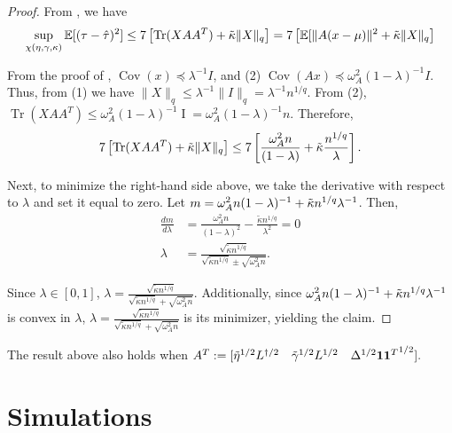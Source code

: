 \documentclass[12pt]{article}
\theoremstyle{definition}
\numberwithin{equation}{section}
\numberwithin{figure}{section}
\numberwithin{equation}{section}
\numberwithin{figure}{section}
\begin{document}
\begin{proof} \label{pf_thm_gsw}
From , we have 
\begin{align*}
    \sup_{\chi(\eta, \gamma, \kappa)} \mathbb{E}[(\tau - \hat{\tau})^2] \leq 7 \left[ \operatorname{Tr}(X AA^T) + \Tilde{\kappa} \| X\|_q \right]= 7 \left[\mathbb{E}[\|A(x-\mu)\|^2 + \Tilde{\kappa} \| X\|_q \right]
\end{align*}

From the proof of \citet[Theorem 6.4]{harshaw2024balancing}, $\operatorname{Cov}(x) \preceq \lambda^{-1}I$, and (2) $\operatorname{Cov}(Ax) \preceq \omega_A^2 (1-\lambda)^{-1}I$. Thus, from (1) we have $\| X \|_q \leq \lambda^{-1}\|I \|_q = \lambda^{-1} n^{1/q}$. From (2), $\operatorname{Tr}(XAA^T) \leq \omega_A^2 (1-\lambda)^{-1} \operatorname{I} = \omega_A^2 (1-\lambda)^{-1} n$. Therefore, 
\begin{align*}
    7 \left[ \operatorname{Tr}(X AA^T) + \Tilde{\kappa} \| X\|_q \right] \leq 7 \left[  \frac{\omega_A^2 n}{(1-\lambda)}+ \Tilde{\kappa} \frac{n^{1/q}}{\lambda} \right].
\end{align*}

Next, to minimize the right-hand side above, we take the derivative with respect to $\lambda$ and set it equal to zero. Let $m = \omega_A^2 n (1-\lambda)^{-1}+ \Tilde{\kappa} n^{1/q}\lambda^{-1}$. Then, 
\begin{align*}
    \frac{dm}{d\lambda} &= \frac{\omega_A^2 n}{(1-\lambda)^2} - \frac{\tilde{\kappa} n^{1/q}}{\lambda^2} = 0 \\
    \lambda &= \frac{\sqrt{\tilde{\kappa}n^{1/q}}}{\sqrt{\tilde{\kappa}n^{1/q}} \pm \sqrt{\omega_A^2 n}}.
\end{align*}

Since $\lambda \in [0,1]$, $\lambda = \frac{\sqrt{\tilde{\kappa}n^{1/q}}}{\sqrt{\tilde{\kappa}n^{1/q}} + \sqrt{\omega_A^2 n}}.$ Additionally, since $\omega_A^2 n(1-\lambda)^{-1}+ \Tilde{\kappa} n^{1/q}\lambda^{-1}$ is convex in $\lambda$, $\lambda = \frac{\sqrt{\tilde{\kappa}n^{1/q}}}{\sqrt{\tilde{\kappa}n^{1/q}} + \sqrt{\omega_A^2 n}}$ is its minimizer, yielding the claim.
\end{proof}

The result above also holds when $A^T:= [\Tilde{\eta}^{1/2}L^{\dagger/2} \quad \Tilde{\gamma}^{1/2} L^{1/2}\quad \Delta^{1/2} {\mathbf{1} \mathbf{1}^T}^{1/2}].$


\section{Simulations}
\end{document}
